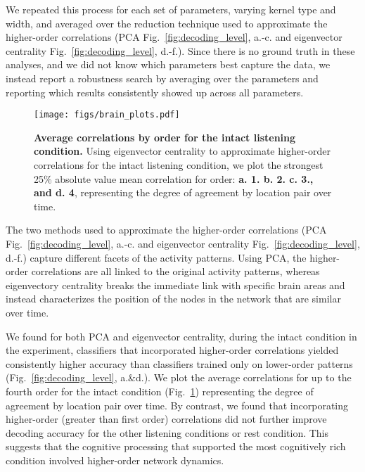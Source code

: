 \documentclass[english]{article}
\begin{document}
We repeated this process for each set of parameters, varying kernel
type and width, and averaged over the reduction technique used to
approximate the higher-order correlations (PCA Fig.~\ref{fig:decoding_level},  a.-c. and eigenvector
centrality Fig.~\ref{fig:decoding_level},  d.-f.).  Since there is no ground truth in these analyses, and we did not know
which parameters best capture the data, we instead report a robustness
search by averaging over the parameters and reporting which results
consistently showed up across all parameters.
\begin{figure}
  \centering
  \texttt{[image: figs/brain\_plots.pdf]}
  \caption{\textbf{Average correlations by order for the intact listening condition.} Using eigenvector
    centrality to approximate higher-order correlations for the intact
    listening condition, we plot the
    strongest 25\% absolute value
    mean correlation for order: \textbf{a. 1. b. 2. c. 3.,
      and d. 4}, representing the degree of agreement by
    location pair over time.}
  \label{fig:brain_plots}
\end{figure}

The two methods used to approximate the higher-order correlations (PCA Fig.~\ref{fig:decoding_level},  a.-c. and eigenvector
centrality Fig.~\ref{fig:decoding_level},  d.-f.) capture different
facets of the activity patterns.  Using PCA, the higher-order
correlations are all linked to the original activity patterns, whereas
eigenvectory centrality breaks the immediate link with specific brain
areas and instead characterizes the position of the nodes in the
network that are similar over time.

We found for both PCA and eigenvector centrality, during the intact condition in the
experiment, classifiers that incorporated higher-order correlations
yielded consistently higher accuracy than classifiers trained only on
lower-order patterns (Fig.~\ref{fig:decoding_level},  a.\&d.).  We plot
the average correlations for up to the fourth order for the intact
condition (Fig.~\ref{fig:brain_plots}) representing the degree of
agreement by location pair over time.  By
contrast, we found that incorporating higher-order (greater than first
order) correlations did
not further improve decoding accuracy for the other listening
conditions or rest condition.  This suggests
that the cognitive processing that supported the most cognitively rich
condition
involved higher-order network dynamics. 




\end{document}
